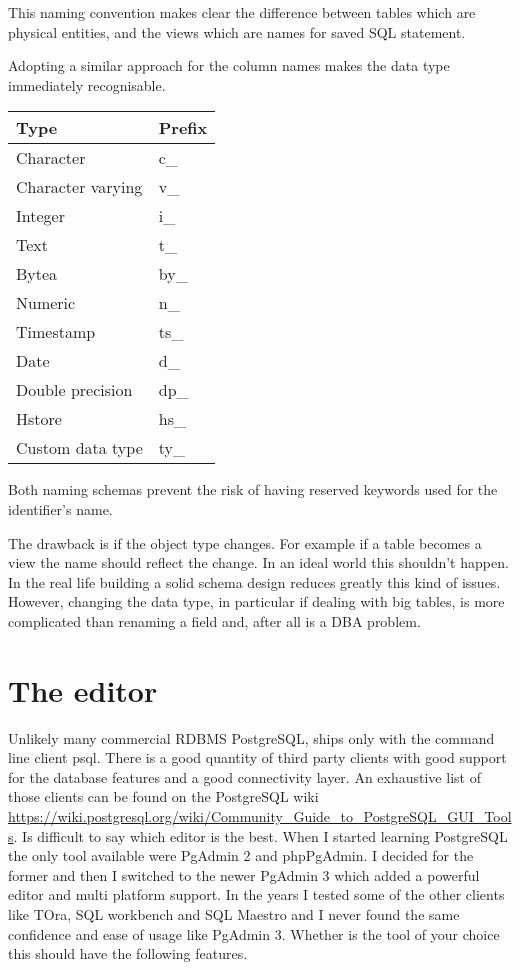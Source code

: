 This naming convention makes clear the difference between tables  which are physical entities, and the views which 
are names for saved SQL statement. \newline

Adopting a similar approach for the column names makes the data type immediately recognisable.

\begin{table}[H]
\begin{tabular}{ll}
 \textbf{Type} & \textbf{Prefix}  \\
 \hline
 Character & c\_ \\
 Character varying & v\_ \\
Integer & i\_ \\
Text & t\_ \\
Bytea & by\_ \\
Numeric & n\_ \\
Timestamp & ts\_ \\
Date & d\_ \\
Double precision & dp\_ \\
Hstore & hs\_ \\
Custom data type & ty\_ \\

\end{tabular}
\end{table}

Both naming schemas prevent the risk of having reserved keywords used for the identifier's name.\newline

The drawback is if the object type changes. For example if a table becomes a view the name should reflect the 
change. In an ideal world this shouldn't happen. In the real life building a solid schema design reduces greatly 
this kind of issues. However, changing the data type, in particular if dealing with big tables, is more complicated 
than renaming a field and, after all is a DBA problem.


\section{The editor}
Unlikely many commercial RDBMS PostgreSQL, ships only with the command line client psql. There is a 
good quantity of third party clients with good support for the database features and a good connectivity 
layer. An exhaustive list of those clients can be found on the PostgreSQL wiki\newline
\href{https://wiki.postgresql.org/wiki/Community\_Guide\_to\_PostgreSQL\_GUI\_Tools}{
https://wiki.postgresql.org/wiki/Community\_Guide\_to\_PostgreSQL\_GUI\_Tools}. Is difficult to say 
which editor is the best. When I started learning PostgreSQL the only tool available were PgAdmin 2 and 
phpPgAdmin. I decided for the former and then I switched to the newer PgAdmin 3 which added a powerful editor and 
multi platform support. In the years I tested some of the other clients like TOra, SQL workbench and SQL Maestro 
and I never found the same confidence and ease of usage like PgAdmin 3. Whether is the tool of your choice this 
should have the following features.

